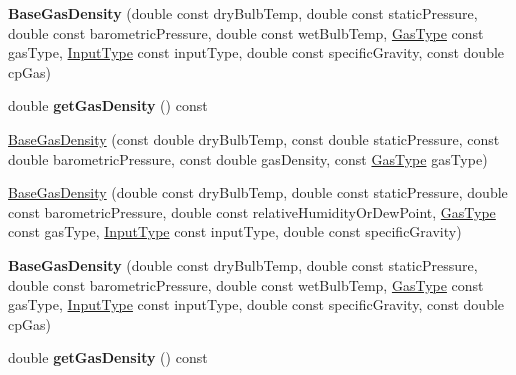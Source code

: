 \begin{DoxyCompactItemize}
\item 
\mbox{\label{class_base_gas_density_a08fc6e441bfec806ea73a9e37be60d92}} 
{\bfseries Base\+Gas\+Density} (double const dry\+Bulb\+Temp, double const static\+Pressure, double const barometric\+Pressure, double const wet\+Bulb\+Temp, \hyperlink{class_base_gas_density_afb215e48f6193462521b7e8d47306ed3}{Gas\+Type} const gas\+Type, \hyperlink{class_base_gas_density_a54f846cc4683a49d3904a40fe2986772}{Input\+Type} const input\+Type, double const specific\+Gravity, const double cp\+Gas)
\item 
\mbox{\label{class_base_gas_density_a1cbf2591aecb384afd5843f0e4a62a4e}} 
double {\bfseries get\+Gas\+Density} () const
\item 
\hyperlink{class_base_gas_density_a84089ddd9d29649d83a7b150b711b989}{Base\+Gas\+Density} (const double dry\+Bulb\+Temp, const double static\+Pressure, const double barometric\+Pressure, const double gas\+Density, const \hyperlink{class_base_gas_density_afb215e48f6193462521b7e8d47306ed3}{Gas\+Type} gas\+Type)
\item 
\hyperlink{class_base_gas_density_a0d53c40eecc4aad87c8fef1cfed1b614}{Base\+Gas\+Density} (double const dry\+Bulb\+Temp, double const static\+Pressure, double const barometric\+Pressure, double const relative\+Humidity\+Or\+Dew\+Point, \hyperlink{class_base_gas_density_afb215e48f6193462521b7e8d47306ed3}{Gas\+Type} const gas\+Type, \hyperlink{class_base_gas_density_a54f846cc4683a49d3904a40fe2986772}{Input\+Type} const input\+Type, double const specific\+Gravity)
\item 
\mbox{\label{class_base_gas_density_a08fc6e441bfec806ea73a9e37be60d92}} 
{\bfseries Base\+Gas\+Density} (double const dry\+Bulb\+Temp, double const static\+Pressure, double const barometric\+Pressure, double const wet\+Bulb\+Temp, \hyperlink{class_base_gas_density_afb215e48f6193462521b7e8d47306ed3}{Gas\+Type} const gas\+Type, \hyperlink{class_base_gas_density_a54f846cc4683a49d3904a40fe2986772}{Input\+Type} const input\+Type, double const specific\+Gravity, const double cp\+Gas)
\item 
\mbox{\label{class_base_gas_density_a1cbf2591aecb384afd5843f0e4a62a4e}} 
double {\bfseries get\+Gas\+Density} () const
\end{DoxyCompactItemize}

